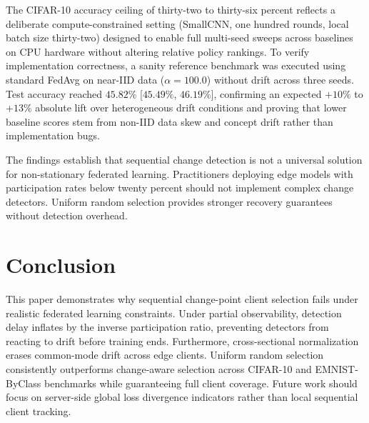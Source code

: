 \documentclass[conference]{IEEEtran}
\begin{document}
The CIFAR-10 accuracy ceiling of thirty-two to thirty-six percent reflects a deliberate compute-constrained setting (SmallCNN, one hundred rounds, local batch size thirty-two) designed to enable full multi-seed sweeps across baselines on CPU hardware without altering relative policy rankings. To verify implementation correctness, a sanity reference benchmark was executed using standard FedAvg on near-IID data ($\alpha = 100.0$) without drift across three seeds. Test accuracy reached $45.82\%$ [$45.49\%$, $46.19\%$], confirming an expected $+10\%$ to $+13\%$ absolute lift over heterogeneous drift conditions and proving that lower baseline scores stem from non-IID data skew and concept drift rather than implementation bugs.

The findings establish that sequential change detection is not a universal solution for non-stationary federated learning. Practitioners deploying edge models with participation rates below twenty percent should not implement complex change detectors. Uniform random selection provides stronger recovery guarantees without detection overhead.

\section{Conclusion}
This paper demonstrates why sequential change-point client selection fails under realistic federated learning constraints. Under partial observability, detection delay inflates by the inverse participation ratio, preventing detectors from reacting to drift before training ends. Furthermore, cross-sectional normalization erases common-mode drift across edge clients. Uniform random selection consistently outperforms change-aware selection across CIFAR-10 and EMNIST-ByClass benchmarks while guaranteeing full client coverage. Future work should focus on server-side global loss divergence indicators rather than local sequential client tracking.
\end{document}
